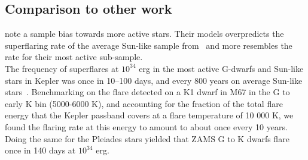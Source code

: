 \documentclass{aa}
\begin{document}
\subsection{Comparison to other work}
\citet{davenport_flaresevolve_2019} note a sample bias towards more active stars. Their models overpredicts the superflaring rate of the average Sun-like sample from~\citet{shibayama_2013} and more resembles the rate for their most active sub-sample.
\\
The frequency of superflares at $10^{34}$ erg in the most active G-dwarfs and Sun-like stars in Kepler was once in 10–100 days, and every 800 years on average Sun-like stars~\citep{shibayama_2013}. Benchmarking on the flare detected on a K1 dwarf in M67 in the G to early K bin (5000-6000 K), and accounting for the fraction of the total flare energy that the Kepler passband covers at a flare temperature of 10 000 K, we found the flaring rate at this energy to amount to about once every 10 years. Doing the same for the Pleiades stars yielded that ZAMS G to K dwarfs flare once in 140 days at $10^{34}$ erg.
\\
\end{document}
